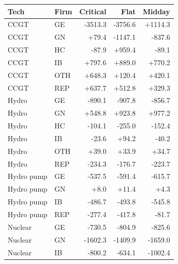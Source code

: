 \begin{tabular}{l l r r r}
\toprule
Tech & Firm & Critical & Flat & Midday \\
\midrule
CCGT & GE & -3513.3 & -3756.6 & +1114.3 \\
CCGT & GN & +79.4 & -1147.1 & -837.6 \\
CCGT & HC & -87.9 & +959.4 & -89.1 \\
CCGT & IB & +797.6 & +889.0 & +770.2 \\
CCGT & OTH & +648.3 & +120.4 & +420.1 \\
CCGT & REP & +637.7 & +512.8 & +329.3 \\
Hydro & GE & -890.1 & -907.8 & -856.7 \\
Hydro & GN & +548.8 & +923.8 & +977.2 \\
Hydro & HC & -104.1 & -255.0 & -152.4 \\
Hydro & IB & -23.6 & +94.2 & -40.2 \\
Hydro & OTH & +39.0 & +33.9 & +34.7 \\
Hydro & REP & -234.3 & -176.7 & -223.7 \\
Hydro pump & GE & -537.5 & -591.4 & -615.7 \\
Hydro pump & GN & +8.0 & +11.4 & +4.3 \\
Hydro pump & IB & -486.7 & -493.8 & -545.8 \\
Hydro pump & REP & -277.4 & -417.8 & -81.7 \\
Nuclear & GE & -730.5 & -804.9 & -825.6 \\
Nuclear & GN & -1602.3 & -1409.9 & -1659.0 \\
Nuclear & IB & -800.2 & -634.1 & -1002.4 \\
\bottomrule
\end{tabular}
